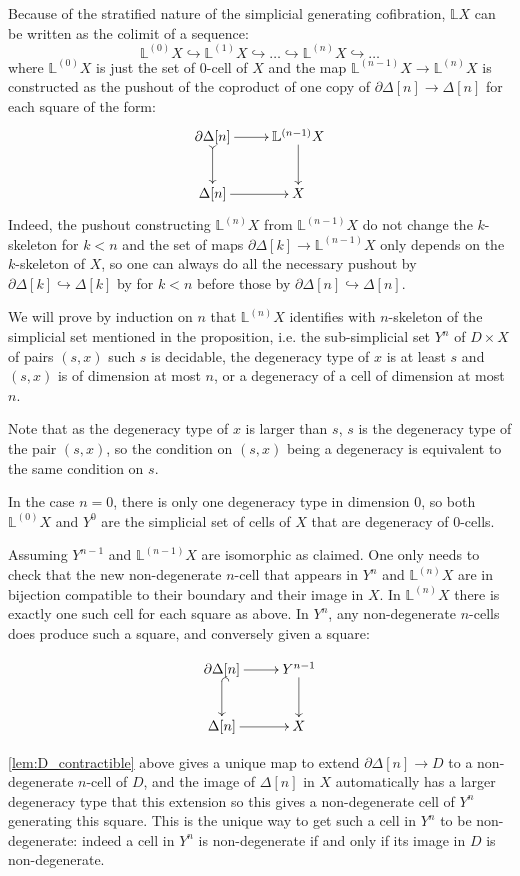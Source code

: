 \documentclass[reqno,10pt,a4paper,oneside]{amsart}
\makeatletter
\renewenvironment{proof}[1][\proofname] {\par\pushQED{\qed}\normalfont\topsep6\p@\@plus6\p@\relax\trivlist\item[\hskip\labelsep\bf#1\@addpunct{.}]\ignorespaces}{\popQED\endtrivlist\@endpefalse}
\numberwithin{equation}{section}
\theoremstyle{mythm}
\theoremstyle{mydef}
\theoremstyle{myrmk}
\makeatother
\begin{document}
\begin{proof} Because of the stratified nature of the simplicial generating cofibration, $\mathbb{L} X$ can be written as the colimit of a sequence:
 \[ 
 \mathbb{L}^{(0)} X \hookrightarrow \mathbb{L}^{(1)} X \hookrightarrow \dots \hookrightarrow \mathbb{L}^{(n)} X \hookrightarrow \dots 
 \]
where $\mathbb{L}^{(0)} X$ is just the set of $0$-cell of $X$ and the map $\mathbb{L}^{(n-1)} X \rightarrow \mathbb{L}^{(n)} X$ is constructed as the pushout of the coproduct of one copy of $\partial \Delta[n] \rightarrow \Delta[n]$ for each square of the form:
\[ 
\xymatrix{\partial \Delta[n]  \ar[r] \ar@{>->}[d] & \mathbb{L}^{(n-1)} X \ar[d] \\ \Delta[n]  \ar[r] & X} 
\]
Indeed, the pushout constructing $\mathbb{L}^{(n)} X$ from $\mathbb{L}^{(n-1)} X$ do not change the $k$-skeleton for $k <n$ and the set of maps $\partial \Delta[k] \rightarrow \mathbb{L}^{(n-1)} X$ only depends on the $k$-skeleton of $X$, so one can always do all the necessary pushout by $\partial \Delta[k] \hookrightarrow \Delta[k]$ by for $k<n$ before those by $\partial \Delta[n] \hookrightarrow \Delta[n]$.


We will prove by induction on $n$ that $\mathbb{L}^{(n)} X$ identifies with $n$-skeleton of the simplicial set mentioned in the proposition, i.e. the sub-simplicial set $Y^n$ of $D \times X$ of pairs $(s,x)$ such $s$ is decidable,  the degeneracy type of $x$ is at least $s$ and $(s,x)$ is of dimension at most $n$, or a degeneracy of a cell of dimension at most $n$.

Note that as the degeneracy type of $x$ is larger than $s$, $s$ is the degeneracy type of the pair $(s,x)$, so the condition on $(s,x)$ being a degeneracy is equivalent to the same condition on $s$.

In the case $n=0$, there is only one degeneracy type in dimension $0$, so both $\mathbb{L}^{(0)} X $ and $Y^0$ are the simplicial set of cells of $X$ that are degeneracy of $0$-cells.

Assuming $Y^{n-1}$ and $\mathbb{L}^{(n-1)} X$ are isomorphic as claimed. One only needs to check that the new non-degenerate $n$-cell that appears in $Y^{n}$ and $\mathbb{L}^{(n)} X $ are in bijection compatible to their boundary and their image in $X$.
In $\mathbb{L}^{(n)} X $ there is exactly one such cell for each square as above. In $Y^{n}$, any non-degenerate $n$-cells does produce such a square, and conversely given a square:

\[ \xymatrix{\partial \Delta[n]  \ar[r] \ar@{^{(}->}[d] & Y^{n-1} \ar[d] \\ \Delta[n]  \ar[r] & X} \]

\cref{lem:D_contractible} above gives a unique map to extend $\partial \Delta[n] \rightarrow D$ to a non-degenerate $n$-cell of $D$, and the image of $\Delta[n]$ in $X$ automatically has a larger degeneracy type that this extension so this gives a non-degenerate cell of $Y^{n}$ generating this square. This is the unique way to get such a cell in $Y^n$ to be non-degenerate: indeed a cell in $Y^n$ is non-degenerate if and only if its image in $D$ is non-degenerate.
\end{proof}
\end{document}
